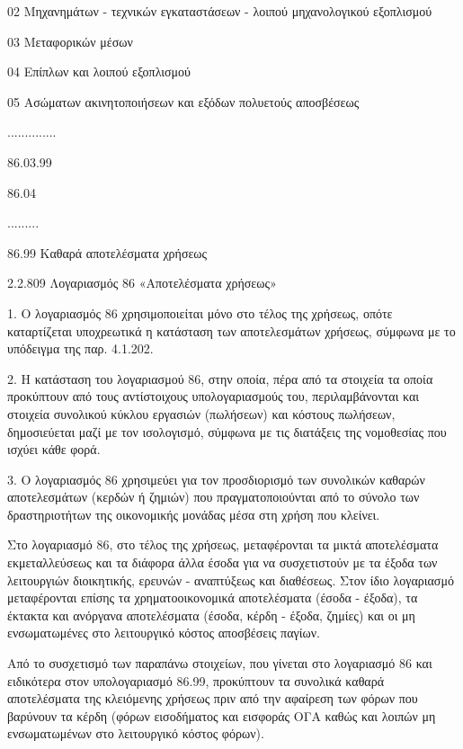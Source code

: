 \documentclass[A4,10pt,greek]{book}
\begin{document}
                               02    Μηχανημάτων - τεχνικών εγκαταστάσεων - λοιπού
                                       μηχανολογικού εξοπλισμού

                               03    Μεταφορικών μέσων

                               04    Επίπλων και λοιπού εξοπλισμού

                               05    Ασώματων ακινητοποιήσεων και εξόδων πολυετούς
                                       αποσβέσεως

                     ..............

                     86.03.99

        86.04

         .........

        86.99    Καθαρά αποτελέσματα χρήσεως

2.2.809 Λογαριασμός 86 «Αποτελέσματα χρήσεως»

1. Ο λογαριασμός 86 χρησιμοποιείται μόνο στο τέλος της χρήσεως, οπότε καταρτίζεται υποχρεωτικά η κατάσταση των αποτελεσμάτων χρήσεως, σύμφωνα με το υπόδειγμα της παρ. 4.1.202.

2. Η κατάσταση του λογαριασμού 86, στην οποία, πέρα από τα στοιχεία τα οποία προκύπτουν από τους αντίστοιχους υπολογαριασμούς του, περιλαμβάνονται και στοιχεία συνολικού κύκλου εργασιών (πωλήσεων) και κόστους πωλήσεων, δημοσιεύεται μαζί με τον ισολογισμό, σύμφωνα με τις διατάξεις της νομοθεσίας που ισχύει κάθε φορά.

3. Ο λογαριασμός 86 χρησιμεύει για τον προσδιορισμό των συνολικών καθαρών αποτελεσμάτων (κερδών ή ζημιών) που πραγματοποιούνται από το σύνολο των δραστηριοτήτων της οικονομικής μονάδας μέσα στη χρήση που κλείνει.

Στο λογαριασμό 86, στο τέλος της χρήσεως, μεταφέρονται τα μικτά αποτελέσματα εκμεταλλεύσεως και τα διάφορα άλλα έσοδα για να συσχετιστούν με τα έξοδα των λειτουργιών διοικητικής, ερευνών - αναπτύξεως και διαθέσεως. Στον ίδιο λογαριασμό μεταφέρονται επίσης τα χρηματοοικονομικά αποτελέσματα (έσοδα - έξοδα), τα έκτακτα και ανόργανα αποτελέσματα (έσοδα, κέρδη - έξοδα, ζημίες) και οι μη ενσωματωμένες στο λειτουργικό κόστος αποσβέσεις παγίων.

Από το συσχετισμό των παραπάνω στοιχείων, που γίνεται στο λογαριασμό 86 και ειδικότερα στον υπολογαριασμό 86.99, προκύπτουν τα συνολικά καθαρά αποτελέσματα της κλειόμενης χρήσεως πριν από την αφαίρεση των φόρων που βαρύνουν τα κέρδη (φόρων εισοδήματος και εισφοράς ΟΓΑ καθώς και λοιπών μη ενσωματωμένων στο λειτουργικό κόστος φόρων).
\end{document}
